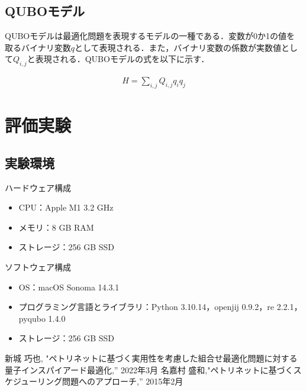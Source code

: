 \documentclass[conference]{IEEEtran}
\begin{document}
\subsection{QUBOモデル}
QUBOモデルは最適化問題を表現するモデルの一種である．変数が0か1の値を取るバイナリ変数$q$として表現される．また，バイナリ変数の係数が実数値として$Q_{i,j}$と表現される．QUBOモデルの式を以下に示す．

\begin{align}
H = \sum_{i,j} Q_{i,j} q_i q_j
\end{align}

\section{評価実験}
\subsection{実験環境}
ハードウェア構成
\begin{itemize}
\item CPU：Apple M1 3.2 GHz
\item メモリ：8 GB RAM
\item ストレージ：256 GB SSD
\end{itemize}  

\vspace{\baselineskip}

ソフトウェア構成 
\begin{itemize}
\item OS：macOS Sonoma 14.3.1
\item プログラミング言語とライブラリ：Python 3.10.14，openjij 0.9.2，re 2.2.1，pyqubo 1.4.0
\item ストレージ：256 GB SSD
\end{itemize}


\begin{thebibliography}{00}
 新城 巧也, "ペトリネットに基づく実用性を考慮した組合せ最適化問題に対する量子インスパイアード最適化,'' 2022年3月
名嘉村 盛和,"ペトリネットに基づくスケジューリング問題へのアプローチ,'' 2015年2月
\end{thebibliography}
\end{document}

